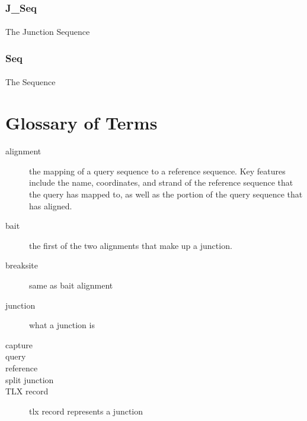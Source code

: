 \documentclass{article}
\begin{document}
\subsubsection*{J\_Seq}
\paragraph{} The Junction Sequence
\subsubsection*{Seq}
\paragraph{} The Sequence 


\section{Glossary of Terms}

\begin{description}

  \item[alignment] the mapping of a query sequence to a reference sequence. Key features include the name, coordinates, and strand of the reference sequence that the query has mapped to, as well as the portion of the query sequence that has aligned.
  \item[bait] the first of the two alignments that make up a junction.
  \item[breaksite] same as bait alignment
  \item[junction] what a junction is
  \item[capture]
  \item[query]
  \item[reference]
  \item[split junction]
  \item[TLX record] tlx record represents a junction

\end{description}
\end{document}
